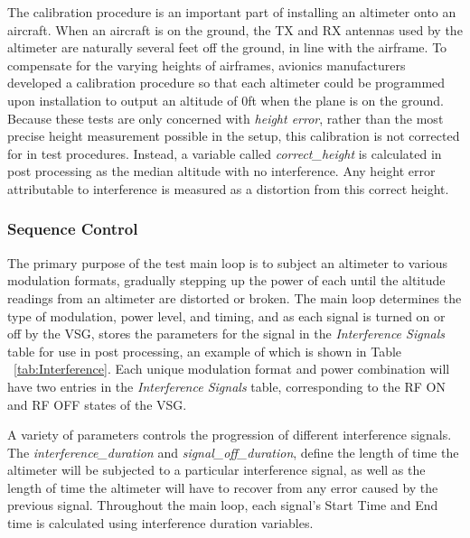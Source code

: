 The calibration procedure is an important part of installing an altimeter onto an aircraft. When an aircraft is on the ground, the TX and RX antennas used by the altimeter are naturally several feet off the ground, in line with the airframe. To compensate for the varying heights of airframes, avionics manufacturers developed a calibration procedure so that each altimeter could be programmed upon installation to output an altitude of 0ft when the plane is on the ground. Because these tests are only concerned with \textit{height error}, rather than the most precise height measurement possible in the setup, this calibration is not corrected for in test procedures. Instead, a variable called \textit{correct\_height} is calculated in post processing as the median altitude with no interference. Any height error attributable to interference is measured as a distortion from this correct height.

\subsubsection{Sequence Control}
The primary purpose of the test main loop is to subject an altimeter to various modulation formats, gradually stepping up the power of each until the altitude readings from an altimeter are distorted or broken. The main loop determines the type of modulation, power level, and timing, and as each signal is turned on or off by the VSG, stores the parameters for the signal in the \textit{Interference Signals} table for use in post processing, an example of which is shown in Table ~\ref{tab:Interference}. Each unique modulation format and power combination will have two entries in the \textit{Interference Signals} table, corresponding to the RF ON and RF OFF states of the VSG.  

A variety of parameters controls the progression of different interference signals.  The \textit{interference\_duration} and \textit{signal\_off\_duration}, define the length of time the altimeter will be subjected to a particular interference signal, as well as the length of time the altimeter will have to recover from any error caused by the previous signal. Throughout the main loop, each signal's Start Time and End time is calculated using interference duration variables.  



